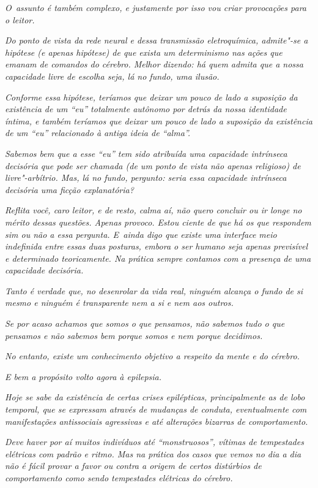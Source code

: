 \emph{O~assunto é também complexo, e justamente por isso vou criar
provocações para o leitor.}

\emph{Do ponto de vista da rede neural e dessa transmissão
eletroquímica, admite"-se a hipótese (e apenas hipótese) de que exista um
determinismo nas ações que emanam de comandos do cérebro. Melhor
dizendo: há quem admita que a nossa capacidade livre de escolha seja, lá
no fundo, uma ilusão.}

\emph{Conforme essa hipótese, teríamos que deixar um pouco de lado a
suposição da existência de um ``eu'' totalmente autônomo por detrás da
nossa identidade íntima, e também teríamos que deixar um pouco de lado a
suposição da existência de um ``eu'' relacionado à antiga ideia de
``alma''.}

\emph{Sabemos bem que a esse ``eu'' tem sido atribuída uma capacidade
intrínseca decisória que pode ser chamada (de um ponto de vista não
apenas religioso) de livre"-arbítrio. Mas, lá no fundo, pergunto: seria
essa capacidade intrínseca decisória uma ficção explanatória?}

\emph{Reflita você, caro leitor, e de resto, calma aí, não quero
concluir ou ir longe no mérito dessas questões. Apenas provoco. Estou
ciente de que há os que respondem sim ou não a essa pergunta. E~ainda
digo que existe uma interface meio indefinida entre essas duas posturas,
embora o ser humano seja apenas previsível e determinado teoricamente.
Na prática sempre contamos com a presença de uma capacidade decisória.}

\emph{Tanto é verdade que, no desenrolar da vida real, ninguém alcança o
fundo de si mesmo e ninguém é transparente nem a si e nem aos outros.}

\emph{Se por acaso achamos que somos o que pensamos, não sabemos tudo o
que pensamos e não sabemos bem porque somos e nem porque decidimos.}

\emph{No entanto, existe um conhecimento objetivo a respeito da mente e
do cérebro.}

\emph{E bem a propósito volto agora à epilepsia.}

\emph{Hoje se sabe da existência de certas crises epilépticas,
principalmente as de lobo temporal, que se expressam através de mudanças
de conduta, eventualmente com manifestações antissociais agressivas e
até alterações bizarras de comportamento.}

\emph{Deve haver por aí muitos indivíduos até ``monstruosos'', vítimas de
tempestades elétricas com padrão e ritmo. Mas na prática dos casos que
vemos no dia a dia não é fácil provar a favor ou contra a origem de
certos distúrbios de comportamento como sendo tempestades elétricas do
cérebro.}

